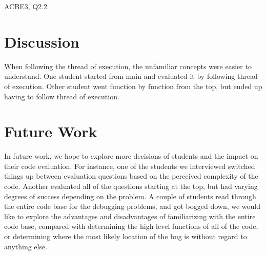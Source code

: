 \documentclass{article}
\begin{document}
ACBE3, Q2.2 

\section{Discussion}
When following the thread of execution, the unfamiliar concepts were easier to understand. 
One student started from main and evaluated it by following thread of execution. Other student went function by function from the top, but ended up having to follow thread of execution. 

\section{Future Work}
In future work, we hope to explore more decisions of students and the impact on their code evaluation.
For instance, one of the students we interviewed switched things up between evaluation questions based on the perceived complexity of the code.
Another evaluated all of the questions starting at the top, but had varying degrees of success depending on the problem.
A couple of students read through the entire code base for the debugging problems, and got bogged down, we would like to explore the advantages and disadvantages of familiarizing with the entire code base, compared with determining the high level functions of all of the code, or determining where the most likely location of the bug is without regard to anything else.
\end{document}
